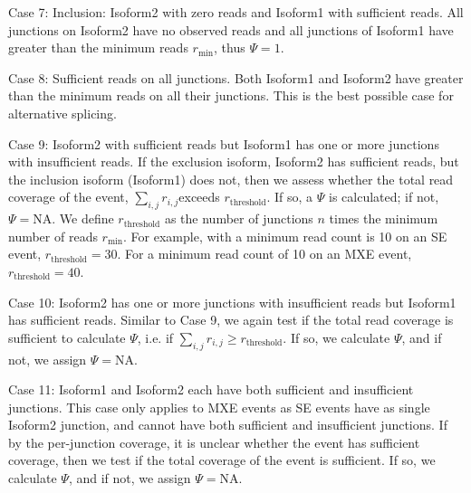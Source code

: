 \begin{longdescription}
	\item[Case 7: Inclusion: Isoform2 with zero reads and Isoform1 with sufficient reads.] All junctions on Isoform2 have no observed reads and all junctions of Isoform1 have greater than the minimum reads $r_{\min}$, thus $\Psi = 1$.
	\item[Case 8: Sufficient reads on all junctions.] Both Isoform1 and Isoform2 have greater than the minimum reads on all their junctions. This is the best possible case for alternative splicing.
	\item[Case 9: Isoform2 with sufficient reads but Isoform1 has one or more junctions with insufficient reads.] If the exclusion isoform, Isoform2 has sufficient reads, but the inclusion isoform (Isoform1) does not, then we assess whether the total read coverage of the event, $\sum_{i,j} r_{i,j}$exceeds $r_{\text{threshold}}$. If so, a $\Psi$ is calculated; if not, $\Psi = \text{NA}$. We define $r_{\text{threshold}}$ as the number of junctions $n$ times the minimum number of reads $r_{\min}$. For example, with a minimum read count is 10 on an SE event, $r_{\text{threshold}} = 30$. For a minimum read count of 10 on an MXE event, $r_{\text{threshold}} = 40$.
	\item[Case 10: Isoform2 has one or more junctions with insufficient reads but Isoform1 has sufficient reads.] Similar to Case 9, we again test if the total read coverage is sufficient to calculate $\Psi$, i.e. if $\sum_{i,j} r_{i,j} \geq r_{\text{threshold}}$. If so, we calculate $\Psi$, and if not, we assign $\Psi = \text{NA}$.
	\item[Case 11: Isoform1 and Isoform2 each have both sufficient and insufficient junctions.] This case only applies to MXE events as SE events have as single Isoform2 junction, and cannot have both sufficient and insufficient junctions. If by the per-junction coverage, it is unclear whether the event has sufficient coverage, then we test if the total coverage of the event is sufficient. If so, we calculate $\Psi$, and if not, we assign $\Psi = \text{NA}$.
\end{longdescription}


